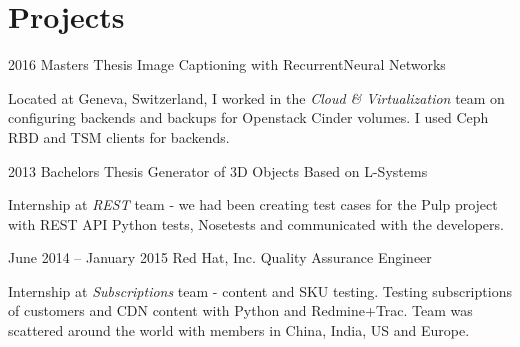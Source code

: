 \documentclass{tccv}
\begin{document}
\section{Projects}

\begin{eventlist}
	
	\item{2016}
	{Masters Thesis}
	{Image Captioning with Recurrent\newline Neural Networks}
	
	Located at Geneva, Switzerland, I worked in the \emph{Cloud \& Virtualization} team on configuring backends and backups for Openstack Cinder volumes. I used Ceph RBD and TSM clients for backends.
	
	\item{2013}
	{Bachelors Thesis}
	{Generator of 3D Objects Based on L-Systems}
	
	Internship at \emph{REST} team -  we had been creating test cases for the Pulp project with REST API Python tests, Nosetests and communicated with the developers.
	
	\item{June 2014 -- January 2015}
	{Red Hat, Inc.}
	{Quality Assurance Engineer}
	
	Internship at \emph{Subscriptions} team - content and SKU testing. Testing subscriptions of customers and CDN content with Python and Redmine+Trac. Team was scattered around the world with members in China, India, US and Europe.
	
\end{eventlist}
\end{document}
